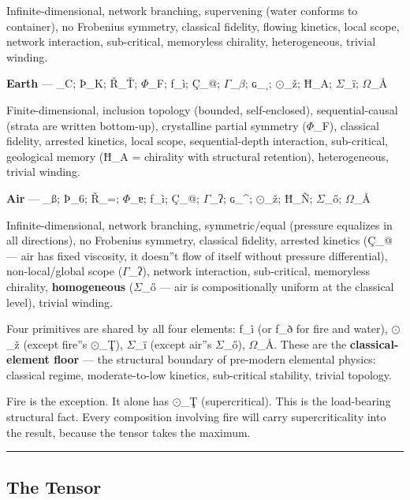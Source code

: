 \documentclass[12pt,a4paper]{article}
\begin{document}
Infinite-dimensional, network branching, supervening (water conforms to container), no Frobenius symmetry, classical fidelity, flowing kinetics, local scope, network interaction, sub-critical, memoryless chirality, heterogeneous, trivial winding.

\textbf{Earth} --- \_C; Þ\_K; Ř\_Ť; $\Phi$\_F; ƒ\_ì; Ç\_@; $\Gamma$\_$\beta$; ɢ\_ˌ; $\odot$\_ž; Ħ\_A; $\Sigma$\_ï; $\Omega$\_Å\rangle

Finite-dimensional, inclusion topology (bounded, self-enclosed), sequential-causal (strata are written bottom-up), crystalline partial symmetry ($\Phi$\_F), classical fidelity, arrested kinetics, local scope, sequential-depth interaction, sub-critical, geological memory (Ħ\_A = chirality with structural retention), heterogeneous, trivial winding.

\textbf{Air} --- \_ß; Þ\_6; Ř\_=; $\Phi$\_ɐ; ƒ\_ì; Ç\_@; $\Gamma$\_ʔ; ɢ\_\^{}; $\odot$\_ž; Ħ\_Ñ; $\Sigma$\_ő; $\Omega$\_Å\rangle

Infinite-dimensional, network branching, symmetric/equal (pressure equalizes in all directions), no Frobenius symmetry, classical fidelity, arrested kinetics (Ç\_@ --- air has fixed viscosity, it doesn''t flow of itself without pressure differential), non-local/global scope ($\Gamma$\_ʔ), network interaction, sub-critical, memoryless chirality, \textbf{homogeneous} ($\Sigma$\_ő --- air is compositionally uniform at the classical level), trivial winding.

Four primitives are shared by all four elements: ƒ\_ì (or ƒ\_ð for fire and water), $\odot$\_ž (except fire''s $\odot$\_Ţ), $\Sigma$\_ï (except air''s $\Sigma$\_ő), $\Omega$\_Å. These are the \textbf{classical-element floor} --- the structural boundary of pre-modern elemental physics: classical regime, moderate-to-low kinetics, sub-critical stability, trivial topology.

Fire is the exception. It alone has $\odot$\_Ţ (supercritical). This is the load-bearing structural fact. Every composition involving fire will carry supercriticality into the result, because the tensor takes the maximum.

\begin{center}
\rule{0.5\textwidth}{0.4pt}
\end{center}

\subsection{The Tensor}
\end{document}
